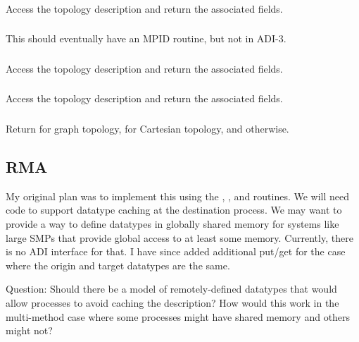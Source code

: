 \documentclass{article}
\begin{document}
\subsubsection{}
Access the topology description and return the associated fields.

\subsubsection{}
This should eventually have an MPID routine, but not in ADI-3.

\subsubsection{}
Access the topology description and return the associated fields.

\subsubsection{}
Access the topology description and return the associated fields.

\subsubsection{}
Return  for graph topology,  for
Cartesian topology, and  otherwise.

\subsection{RMA}
\label{sec:rma}
My original plan was to implement this using the ,
,  and  routines.  We
will need code to support datatype caching at the destination process.
We may want to provide a way to define datatypes in globally shared
memory for systems like large SMPs that provide global access to at
least some memory.  Currently, there is no ADI interface for that.
I have since added additional put/get for the case where the origin
and target datatypes are the same.  

Question:  Should there be a model of remotely-defined datatypes that
would allow processes to avoid caching the description?  How would
this work in the multi-method case where some processes might have
shared memory and others might not?
\end{document}
